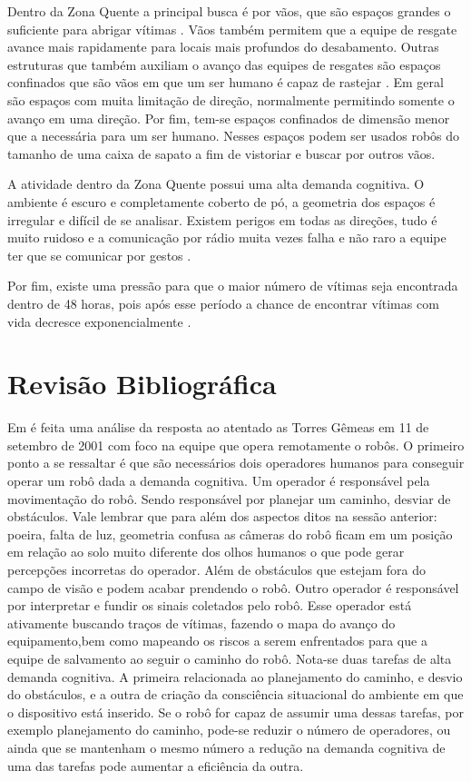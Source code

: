 \documentclass[
	article,			%
	11pt,				%
	oneside,			%
	a4paper,			%
	english,			%
	brazil,				%
	sumario=tradicional	
	]{abntex2}
\begin{document}
Dentro da Zona Quente a principal busca é por vãos, que são espaços grandes o suficiente para abrigar vítimas \cite{bomsp}. Vãos também permitem que a equipe de resgate avance mais rapidamente para locais mais profundos do desabamento. Outras estruturas que também auxiliam o avanço das equipes de resgates são espaços confinados que são vãos em que um ser humano é capaz de rastejar \cite{Robin2004}. Em geral são espaços com muita limitação de direção, normalmente permitindo somente o avanço em uma direção. Por fim, tem-se espaços confinados de dimensão menor que a necessária para um ser humano. Nesses espaços podem ser usados robôs do tamanho de uma caixa de sapato a fim de vistoriar e buscar por outros vãos.

A atividade dentro da Zona Quente possui uma alta demanda cognitiva. O ambiente é escuro e completamente coberto de pó, a geometria dos espaços é irregular e difícil de se analisar. Existem perigos em todas as direções, tudo é muito ruidoso e a comunicação por rádio muita vezes falha e não raro a equipe ter que se comunicar por gestos \cite{Robin2004} \cite{fin2004}.

Por fim, existe uma pressão para que o maior número de vítimas seja encontrada dentro de 48 horas, pois após esse período a chance de encontrar vítimas com vida decresce exponencialmente \cite{Robin2004}.

\section{Revisão Bibliográfica}

Em \cite{Robin2004} é feita uma análise da resposta ao atentado as Torres Gêmeas em 11 de setembro de 2001 com foco na equipe que opera remotamente o robôs. O primeiro ponto a se ressaltar é que são necessários dois operadores humanos para conseguir operar um robô dada a demanda cognitiva. Um operador é responsável pela movimentação do robô. Sendo responsável por planejar um caminho, desviar de obstáculos. Vale lembrar que para além dos aspectos ditos na sessão anterior: poeira, falta de luz, geometria confusa as câmeras do robô ficam em um posição em relação ao solo muito diferente dos olhos humanos o que pode gerar percepções incorretas do operador. Além de obstáculos que estejam fora do campo de visão e podem acabar prendendo o robô.  Outro operador é responsável por interpretar e fundir os sinais coletados pelo robô. Esse operador está ativamente buscando traços de vítimas, fazendo o mapa do avanço do equipamento,bem como mapeando os riscos a serem enfrentados para que a equipe de salvamento ao seguir o caminho do robô. Nota-se duas tarefas de alta demanda cognitiva. A primeira relacionada ao planejamento do caminho, e desvio do obstáculos, e a outra de criação da consciência situacional do ambiente em que o dispositivo está inserido. Se o robô for capaz de assumir uma dessas tarefas, por exemplo planejamento do caminho, pode-se reduzir o número de operadores, ou ainda que se mantenham o mesmo número a redução na demanda cognitiva de uma das tarefas pode aumentar a eficiência da outra.
\end{document}
